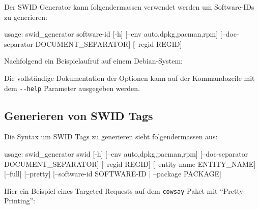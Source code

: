 Der SWID Generator kann folgendermassen verwendet werden um Software-IDs zu
generieren:

\begin{textcode}
usage: swid_generator software-id [-h] [--env {auto,dpkg,pacman,rpm}]
                                  [--doc-separator DOCUMENT_SEPARATOR]
                                  [--regid REGID]
\end{textcode}

Nachfolgend ein Beispielaufruf auf einem Debian-System:


Die vollständige Dokumentation der Optionen kann auf der Kommandozeile mit dem
\texttt{-{}-help} Parameter ausgegeben werden.


\subsection{Generieren von SWID Tags}

Die Syntax um SWID Tags zu generieren sieht folgendermassen aus:

\begin{textcode}
usage: swid_generator swid [-h] [--env {auto,dpkg,pacman,rpm}]
                           [--doc-separator DOCUMENT_SEPARATOR]
                           [--regid REGID] [--entity-name ENTITY_NAME]
                           [--full] [--pretty]
                           [--software-id SOFTWARE-ID | --package PACKAGE]
\end{textcode}

Hier ein Beispiel eines Targeted Requests auf dem \texttt{cowsay}-Paket mit
\enquote{Pretty-Printing}:



